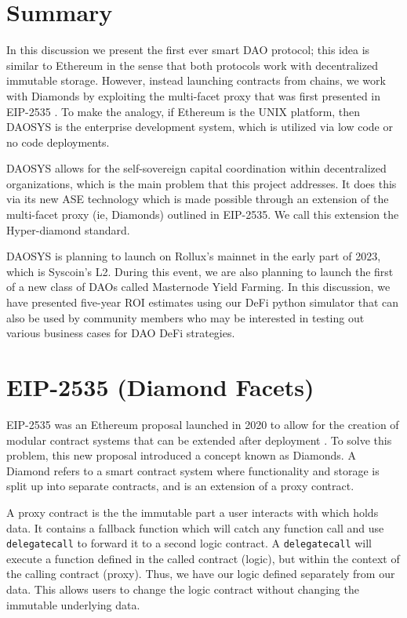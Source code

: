 \documentclass[journal,twocolumn,12pt]{ieeesyscoin}
\begin{document}
\section{Summary}
\label{section:summary}

In this discussion we present the first ever smart DAO protocol; this idea is similar to Ethereum in the sense that both protocols work with decentralized immutable storage. However, instead launching contracts from chains, we work with Diamonds by exploiting the multi-facet proxy that was first presented in EIP-2535 \cite{Mud20}. To make the analogy, if Ethereum is the UNIX platform, then DAOSYS is the enterprise development system, which is utilized via low code or no code deployments.

DAOSYS allows for the self-sovereign capital coordination within decentralized organizations, which is the main problem that this project addresses. It does this via its new ASE technology which is made possible through an extension of the multi-facet proxy (ie, Diamonds) outlined in EIP-2535. We call this extension the Hyper-diamond standard.

DAOSYS is planning to launch on Rollux's mainnet in the early part of 2023, which is Syscoin's L2. During this event, we are also planning to launch the first of a new class of DAOs called Masternode Yield Farming. In this discussion, we have presented five-year ROI estimates using our DeFi python simulator that can also be used by community members who may be interested in testing out various business cases for DAO DeFi strategies. 

\appendices

\section{EIP-2535 (Diamond Facets)}
\label{sec:diamond}

EIP-2535 was an Ethereum proposal launched in 2020 to allow for the creation of modular contract systems that can be extended after deployment \cite{Mud20}. To solve this problem, this new proposal introduced a concept known as Diamonds. A Diamond refers to a smart contract system where functionality and storage is split up into separate contracts, and is an extension of a proxy contract.

A proxy contract is the the immutable part a user interacts with which holds data. It contains a fallback function which will catch any function call and use \texttt{delegatecall} to forward it to a second logic contract. A \texttt{delegatecall} will execute a function defined in the called contract (logic), but within the context of the calling contract (proxy). Thus, we have our logic defined separately from our data. This allows users to change the logic contract without changing the immutable underlying data. 
\end{document}
